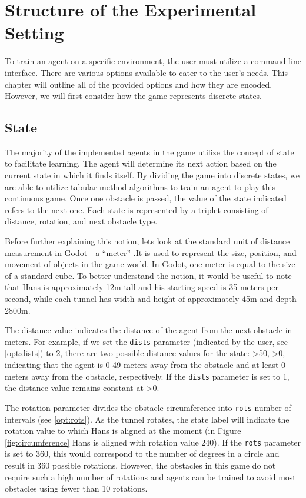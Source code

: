 \chapter{Structure of the Experimental Setting}
\label{agent_code_chapter}
To train an agent on a specific environment, the user must utilize a command-line interface. There are various options available to cater to the user's needs. This chapter will outline all of the provided options and how they are encoded. However, we will first consider how the game represents discrete states.

\section{State}
The majority of the implemented agents in the game utilize the concept of state to facilitate learning. The agent will determine its next action based on the current state in which it finds itself. By dividing the game into discrete states, we are able to utilize tabular method algorithms to train an agent to play this continuous game. Once one obstacle is passed, the value of the state indicated refers to the next one. Each state is represented by a triplet consisting of distance, rotation, and next obstacle type. 

Before further explaining this notion, lets look at the standard unit of distance measurement in Godot - a ``meter'' .It is used to represent the size, position, and movement of objects in the game world. In Godot, one meter is equal to the size of a standard cube. To better understand the notion, it would be useful to note that Hans is approximately 12m tall and his starting speed is 35 meters per second, while each tunnel has width and height of approximately 45m and depth 2800m.

The distance value indicates the distance of the agent from the next obstacle in meters. For example, if we set the \texttt{dists} parameter (indicated by the user, see \ref{opt:dists}) to 2, there are two possible distance values for the state: \textgreater 50, \textgreater 0, indicating that the agent is 0-49 meters away from the obstacle and at least 0 meters away from the obstacle, respectively. If the \texttt{dists} parameter is set to 1, the distance value remains constant at \textgreater 0. 

The rotation parameter divides the obstacle circumference into \texttt{rots} number of intervals (see \ref{opt:rots}). As the tunnel rotates, the state label will indicate the rotation value to which Hans is aligned at the moment (in Figure \ref{fig:circumference} Hans is aligned with rotation value 240). If the \texttt{rots} parameter is set to 360, this would correspond to the number of degrees in a circle and result in 360 possible rotations. However, the obstacles in this game do not require such a high number of rotations and agents can be trained to avoid most obstacles using fewer than 10 rotations. 

